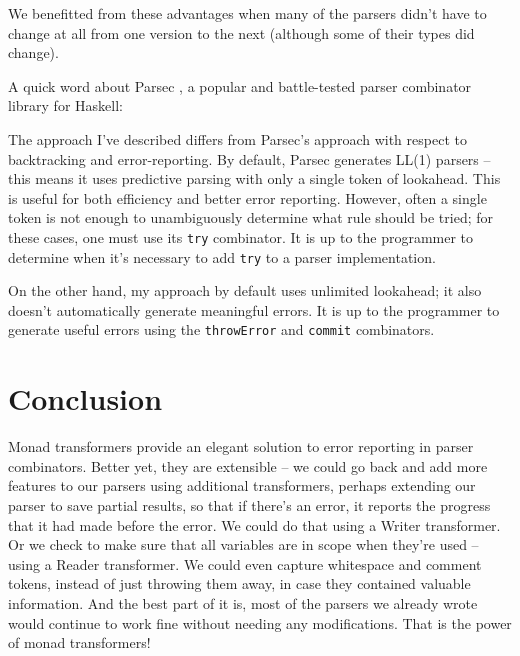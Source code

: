 \documentclass{tmr}
\begin{document}
We benefitted from these advantages when many of the parsers didn't have to change 
at all from one version to the next (although some of their types did change).




A quick word about Parsec \cite{leijen}, a popular and battle-tested parser 
combinator library for Haskell:

The approach I've described differs from Parsec's approach with respect to 
backtracking and error-reporting.  By default, Parsec generates LL(1) parsers --
this means it uses predictive parsing with only a single token of lookahead.  This
is useful for both efficiency and better error reporting.  However, often a 
single token is not enough to unambiguously determine what rule should be tried;
for these cases, one must use its \verb+try+ combinator.  It is up to the
programmer to determine when it's necessary to add \verb+try+ to a parser
implementation.

On the other hand, my approach by default uses unlimited lookahead; it also 
doesn't automatically generate meaningful errors.  It is up to the programmer 
to generate useful errors using the \verb+throwError+ and \verb+commit+ 
combinators.




\section{Conclusion}
Monad transformers provide an elegant solution to error reporting in parser
combinators.  Better yet, they are extensible -- we could go back and add more
features to our parsers using additional transformers, perhaps extending our
parser to save partial results, so that if there's an error, it reports the
progress that it had made before the error.  We could do that using a Writer
transformer.  Or we check to make sure that all variables are in scope when
they're used -- using a Reader transformer.  We could even capture whitespace
and comment tokens, instead of just throwing them away, in case they contained
valuable information.  And the best part of it is, most of the parsers we already
wrote would continue to work fine without needing any modifications.  That
is the power of monad transformers!





\end{document}

